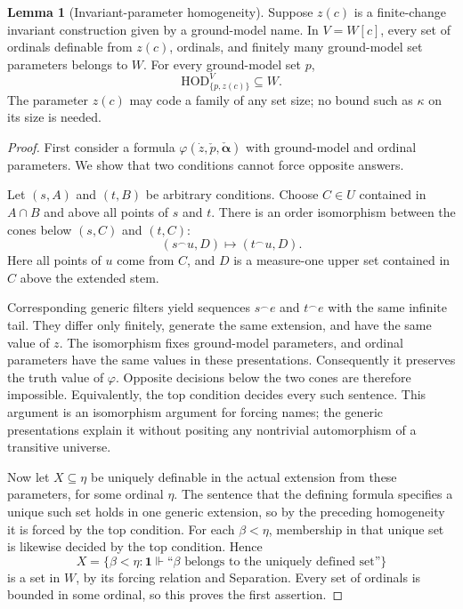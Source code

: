 \documentclass[11pt,letterpaper]{article}
\theoremstyle{definition}
\newtheorem{lemma}[definition]{Lemma}
\numberwithin{equation}{section}
\newcommand{\HOD}{\mathrm{HOD}}
\begin{document}
\begin{lemma}[Invariant-parameter homogeneity]\label{lem:homogeneity}
Suppose $z(c)$ is a finite-change invariant construction given by a ground-model name. In $V=W[c]$, every set of ordinals definable from $z(c)$, ordinals, and finitely many ground-model set parameters belongs to $W$. For every ground-model set $p$,
\[
 \HOD_{\{p,z(c)\}}^V\subseteq W.
\]
The parameter $z(c)$ may code a family of any set size; no bound such as $\kappa$ on its size is needed.
\end{lemma}
\begin{proof}
First consider a formula $\varphi(\dot z,\check p,\check{\boldsymbol\alpha})$ with ground-model and ordinal parameters. We show that two conditions cannot force opposite answers.

Let $(s,A)$ and $(t,B)$ be arbitrary conditions. Choose $C\in U$ contained in $A\cap B$ and above all points of $s$ and $t$. There is an order isomorphism between the cones below $(s,C)$ and $(t,C)$:
\begin{equation}\label{eq:cone}
 (s^\frown u,D)\longmapsto(t^\frown u,D).
\end{equation}
Here all points of $u$ come from $C$, and $D$ is a measure-one upper set contained in $C$ above the extended stem.

Corresponding generic filters yield sequences $s^\frown e$ and $t^\frown e$ with the same infinite tail. They differ only finitely, generate the same extension, and have the same value of $z$. The isomorphism fixes ground-model parameters, and ordinal parameters have the same values in these presentations. Consequently it preserves the truth value of $\varphi$. Opposite decisions below the two cones are therefore impossible. Equivalently, the top condition decides every such sentence. This argument is an isomorphism argument for forcing names; the generic presentations explain it without positing any nontrivial automorphism of a transitive universe.

Now let $X\subseteq\eta$ be uniquely definable in the actual extension from these parameters, for some ordinal $\eta$. The sentence that the defining formula specifies a unique such set holds in one generic extension, so by the preceding homogeneity it is forced by the top condition. For each $\beta<\eta$, membership in that unique set is likewise decided by the top condition. Hence
\[
 X=\{\beta<\eta:\mathbf1\Vdash\text{``$\beta$ belongs to the uniquely defined set''}\}
\]
is a set in $W$, by its forcing relation and Separation. Every set of ordinals is bounded in some ordinal, so this proves the first assertion.


\end{proof}
\end{document}
